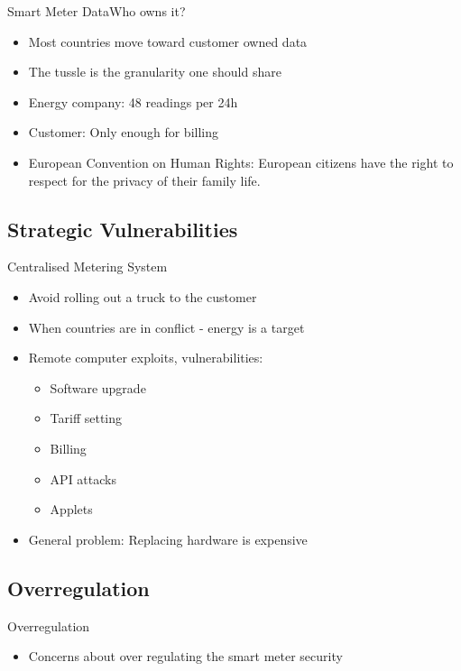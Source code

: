 \documentclass[10pt]{beamer}
\begin{document}
\begin{frame}{Smart Meter Data}{Who owns it?}
	\begin{itemize}
		\item Most countries move toward customer owned data
		\item The tussle is the granularity one should share
		\item Energy company: 48 readings per 24h
		\item Customer: Only enough for billing
		\item European Convention on Human Rights: European citizens have the right to respect for the privacy	of their family life.
	\end{itemize}
\end{frame}

\subsection{Strategic Vulnerabilities}
\begin{frame}{Centralised Metering System}
\begin{itemize}
	\item Avoid rolling out a truck to the customer
	\item When countries are in conflict - energy is a target
	\item Remote computer exploits, vulnerabilities:
	\begin{itemize}
		\item Software upgrade
		\item Tariff setting
		\item Billing
		\item API attacks
		\item Applets
	\end{itemize}
	\item General problem: Replacing hardware is expensive
\end{itemize}
\end{frame}

\subsection{Overregulation}
\begin{frame}{Overregulation}
	\begin{itemize}
		\item Concerns about over regulating the smart meter security
	\end{itemize}
	
\end{frame}
\end{document}
